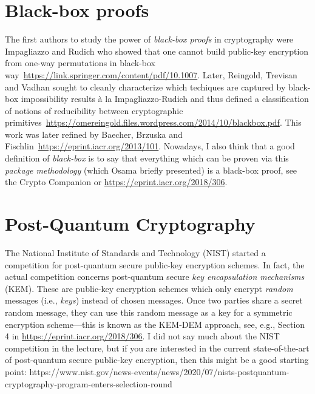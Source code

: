 \documentclass[a4paper,table,dvipsnames]{article}
\theoremstyle{definition}
\begin{document}
\section{Black-box proofs}\label{sec:bb}
The first authors to study the power of \emph{black-box proofs} in cryptography
were Impagliazzo and Rudich who showed that one cannot build public-key encryption
from one-way permutations in black-box way~\url{https://link.springer.com/content/pdf/10.1007}.
Later, Reingold, Trevisan and Vadhan sought to cleanly characterize which techiques are captured
by black-box impossibility results \`a la Impagliazzo-Rudich and thus defined a classification
of notions of reducibility between cryptographic primitives~\url{https://omereingold.files.wordpress.com/2014/10/blackbox.pdf}.
This work was later refined by Baecher, Brzuska and Fischlin~\url{https://eprint.iacr.org/2013/101}.
Nowadays, I also think that a good definition of \emph{black-box} is to say that everything
which can be proven via this \emph{package methodology} (which Osama briefly presented) is
a black-box proof, see the Crypto Companion or  \url{https://eprint.iacr.org/2018/306}.

\section{Post-Quantum Cryptography}\label{sec:pq}
The National Institute of Standards and Technology (NIST) started a competition for
post-quantum secure public-key encryption schemes. In fact, the actual competition
concerns post-quantum secure \emph{key encapsulation mechanisms} (KEM). These are public-key
encryption schemes which only encrypt \emph{random} messages (i.e., \emph{keys}) instead
of chosen messages. Once two parties share a secret random message, they can use this random
message as a key for a symmetric encryption scheme---this is known as the KEM-DEM approach,
see, e.g., Section 4 in \url{https://eprint.iacr.org/2018/306}. I did not say much about
the NIST competition in the lecture, but if you are
interested in the current state-of-the-art of post-quantum secure
public-key encryption, then this might be a good starting point:
https://www.nist.gov/news-events/news/2020/07/nists-postquantum-cryptography-program-enters-selection-round
\end{document}
